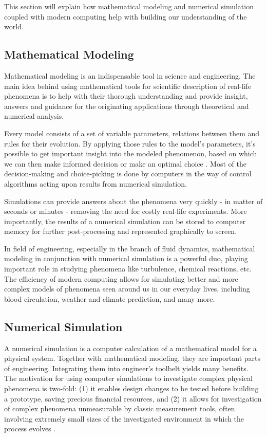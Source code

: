 This section will explain how mathematical modeling and numerical simulation coupled with modern computing help with building our understanding of the world.

\subsection{Mathematical Modeling}
Mathematical modeling is an indispensable tool in science and engineering. The main idea behind using mathematical tools for scientific description of real-life phenomena is to help with their thorough understanding and provide insight, answers and guidance for the originating applications through theoretical and numerical analysis.

Every model consists of a set of variable parameters, relations between them and rules for their evolution. By applying those rules to the model's parameters, it's possible to get important insight into the modeled phenomenon, based on which we can then make informed decision or make an optimal choice \citep{Neumaier2004}. Most of the decision-making and choice-picking is done by computers in the way of control algorithms acting upon results from numerical simulation. 

Simulations can provide answers about the phenomena very quickly - in matter of seconds or minutes - removing the need for costly real-life experiments. More importantly, the results of a numerical simulation can be stored to computer memory for further post-processing and represented graphically to screen.

In field of engineering, especially in the branch of fluid dynamics, mathematical modeling in conjunction with numerical simulation is a powerful duo, playing important role in studying phenomena like turbulence, chemical reactions, etc. The efficiency of modern computing allows for simulating better and more complex models of phenomena seen around us in our everyday lives, including blood circulation, weather and climate prediction, and many more.

\subsection{Numerical Simulation}
A numerical simulation is a computer calculation of a mathematical model for a physical system. Together with mathematical modeling, they are important parts of engineering. Integrating them into engineer's toolbelt yields many benefits. The motivation for using computer simulations to investigate complex physical phenomena is two-fold: (1) it enables design changes to be tested before building a prototype, saving precious financial resources, and (2) it allows for investigation of complex phenomena unmeasurable by classic measurement tools, often involving extremely small sizes of the investigated environment in which the process evolves \citep{rago2015numerical}.

